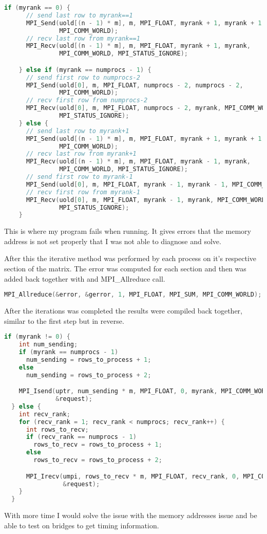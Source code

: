 \documentclass[a4paper]{article}
\begin{document}
\begin{lstlisting}[language=C++]
    if (myrank == 0) {
      // send last row to myrank==1
      MPI_Send(uold[(n - 1) * m], m, MPI_FLOAT, myrank + 1, myrank + 1,
               MPI_COMM_WORLD);
      // recv last row from myrank==1
      MPI_Recv(uold[(n - 1) * m], m, MPI_FLOAT, myrank + 1, myrank,
               MPI_COMM_WORLD, MPI_STATUS_IGNORE);

    } else if (myrank == numprocs - 1) {
      // send first row to numprocs-2
      MPI_Send(uold[0], m, MPI_FLOAT, numprocs - 2, numprocs - 2,
               MPI_COMM_WORLD);
      // recv first row from numprocs-2
      MPI_Recv(uold[0], m, MPI_FLOAT, numprocs - 2, myrank, MPI_COMM_WORLD,
               MPI_STATUS_IGNORE);
    } else {
      // send last row to myrank+1
      MPI_Send(uold[(n - 1) * m], m, MPI_FLOAT, myrank + 1, myrank + 1,
               MPI_COMM_WORLD);
      // recv last row from myrank+1
      MPI_Recv(uold[(n - 1) * m], m, MPI_FLOAT, myrank - 1, myrank,
               MPI_COMM_WORLD, MPI_STATUS_IGNORE);
      // send first row to myrank-1
      MPI_Send(uold[0], m, MPI_FLOAT, myrank - 1, myrank - 1, MPI_COMM_WORLD);
      // recv first row from myrank-1
      MPI_Recv(uold[0], m, MPI_FLOAT, myrank - 1, myrank, MPI_COMM_WORLD,
               MPI_STATUS_IGNORE);
    }
\end{lstlisting}

This is where my program fails when running. It gives errors that the memory address is not set properly that I was not able to diagnose and solve.

After this the iterative method was performed by each process on it's respective section of the matrix. The error was computed for each section and then was added back together with and MPI\_Allreduce call.

\begin{lstlisting}[language=C++]
MPI_Allreduce(&error, &gerror, 1, MPI_FLOAT, MPI_SUM, MPI_COMM_WORLD);
\end{lstlisting}

After the iterations was completed the results were compiled back together, similar to the first step but in reverse.

\begin{lstlisting}[language=C++]
  if (myrank != 0) {
    int num_sending;
    if (myrank == numprocs - 1)
      num_sending = rows_to_process + 1;
    else
      num_sending = rows_to_process + 2;

    MPI_Isend(uptr, num_sending * m, MPI_FLOAT, 0, myrank, MPI_COMM_WORLD,
              &request);
  } else {
    int recv_rank;
    for (recv_rank = 1; recv_rank < numprocs; recv_rank++) {
      int rows_to_recv;
      if (recv_rank == numprocs - 1)
        rows_to_recv = rows_to_process + 1;
      else
        rows_to_recv = rows_to_process + 2;

      MPI_Irecv(umpi, rows_to_recv * m, MPI_FLOAT, recv_rank, 0, MPI_COMM_WORLD,
                &request);
    }
  }
\end{lstlisting}

With more time I would solve the issue with the memory addresses issue and be able to test on bridges to get timing information.

\pagebreak
\end{document}
